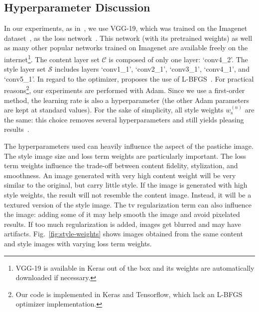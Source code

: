 \subsection{Hyperparameter Discussion}
In our experiments, as in~\cite{gatys2016image}, we use VGG-19, which was trained on the Imagenet dataset~\cite{ILSVRC15,deng2009imagenet}, as the loss network~\cite{simonyan2014very}. This network (with its pretrained weights) as well as many other popular networks trained on Imagenet are available freely on the internet\footnote{VGG-19 is available in Keras out of the box and its weights are automatically downloaded if necessary.}. The content layer set $\mathcal{C}$ is composed of only one layer: `conv4\_2'. The style layer set $\mathcal{S}$ includes layers `conv1\_1', `conv2\_1', `conv3\_1', `conv4\_1', and `conv5\_1'. In regard to the optimizer, \cite{gatys2016image} proposes the use of L-BFGS~\cite{zhu1997algorithm}. For practical reasons\footnote{Our code is implemented in Keras and Tensorflow, which lack an L-BFGS optimizer implementation.}, our experiments are performed with Adam. Since we use a first-order method, the learning rate is also a hyperparameter (the other Adam parameters are kept at standard values). For the sake of simplicity, all style weights $w^{(n)}_\text{s}$ are the same: this choice removes several hyperparameters and still yields pleasing results~\cite{gatys2016image}.

The hyperparameters used can heavily influence the aspect of the pastiche image. The style image size and loss term weights are particularly important. The loss term weights influence the trade-off between content fidelity, stylization, and smoothness. An image generated with very high content weight will be very similar to the original, but carry little style. If the image is generated with high style weights, the result will not resemble the content image. Instead, it will be a textured version of the style image. The tv regularization term can also influence the image: adding some of it may help smooth the image and avoid pixelated results. If too much regularization is added, images get blurred and may have artifacts. Fig.~\ref{fig:style-weights} shows images obtained from the same content and style images with varying loss term weights.

